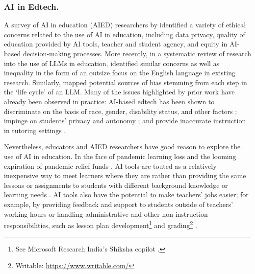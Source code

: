 \subsubsection*{AI in Edtech.} 
A survey of AI in education (AIED) researchers by \citet{holmes_ethics_2022} identified a variety of ethical concerns related to the use of AI in education, including data privacy, quality of education provided by AI tools, teacher and student agency, and equity in AI-based decision-making processes. More recently, in a systematic review of research into the use of LLMs in education, \citet{yan_2024_practical} identified similar concerns as well as inequality in the form of an outsize focus on the English language in existing research. Similarly, \citet{lee2024life} mapped potential sources of bias stemming from each step in the `life cycle' of an LLM. Many of the issues highlighted by prior work have already been observed in practice: AI-based edtech has been shown to discriminate on the basis of race, gender, disability status, and other factors \cite{baker_algorithmic_2022}; impinge on students' privacy and autonomy \cite{diberardino_anti-intentional_2023, commonsense2023}; and provide inaccurate instruction in tutoring settings \cite{wsj_khan}.

Nevertheless, educators and AIED researchers have good reason to explore the use of AI in education. In the face of pandemic learning loss and the looming expiration of pandemic relief funds \cite{esser, pandemic_recovery}, AI tools are touted as a relatively inexpensive way to meet learners where they are rather than providing the same lessons or assignments to students with different background knowledge or learning needs \cite{cardona_artificial_2023, dai_lin_jin_li_tsai_gasevic_chen_2023, MEYER2024100199}. AI tools also have the potential to make teachers' jobs easier; for example, by providing feedback and support to students outside of teachers' working hours or handling administrative and other non-instruction responsibilities, such as lesson plan development\footnote{See Microsoft Research India's Shiksha copilot \cite{ms_india}.} and grading\footnote{Writable: \url{https://www.writable.com/}} \cite{cardona_artificial_2023}. 


